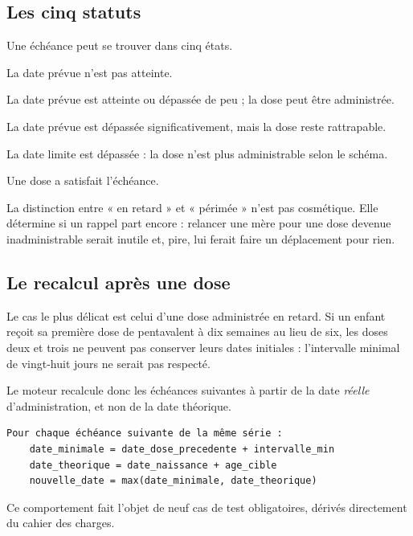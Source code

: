 \documentclass[11pt,a4paper]{report}
\begin{document}
\subsection{Les cinq statuts}

Une échéance peut se trouver dans cinq états.

\begin{description}[leftmargin=2.5cm, style=nextline]
  \item[À venir] La date prévue n'est pas atteinte.
  \item[Due] La date prévue est atteinte ou dépassée de peu ; la dose peut
  être administrée.
  \item[En retard] La date prévue est dépassée significativement, mais la
  dose reste rattrapable.
  \item[Périmée] La date limite est dépassée : la dose n'est plus
  administrable selon le schéma.
  \item[Administrée] Une dose a satisfait l'échéance.
\end{description}

La distinction entre « en retard » et « périmée » n'est pas cosmétique. Elle
détermine si un rappel part encore : relancer une mère pour une dose devenue
inadministrable serait inutile et, pire, lui ferait faire un déplacement pour
rien.

\subsection{Le recalcul après une dose}

Le cas le plus délicat est celui d'une dose administrée en retard. Si un
enfant reçoit sa première dose de pentavalent à dix semaines au lieu de six,
les doses deux et trois ne peuvent pas conserver leurs dates initiales :
l'intervalle minimal de vingt-huit jours ne serait pas respecté.

Le moteur recalcule donc les échéances suivantes à partir de la date
\emph{réelle} d'administration, et non de la date théorique.

\begin{lstlisting}[caption=Principe du recalcul après administration]
Pour chaque échéance suivante de la même série :
    date_minimale = date_dose_precedente + intervalle_min
    date_theorique = date_naissance + age_cible
    nouvelle_date = max(date_minimale, date_theorique)
\end{lstlisting}

Ce comportement fait l'objet de neuf cas de test obligatoires, dérivés
directement du cahier des charges.
\end{document}
